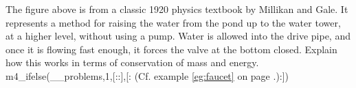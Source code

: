 The figure above is from a classic 1920 physics textbook
by Millikan and Gale. It represents a method for raising the
water from the pond up to the water tower, at a higher level,
without using a pump. Water is allowed into the drive pipe,
and once it is flowing fast enough, it forces the valve at the
bottom closed. Explain how this works in terms of conservation
of mass and energy.
m4_ifelse(__problems,1,[::],[:%
(Cf. example \ref{eg:faucet} on page \pageref{eg:faucet}.):])
